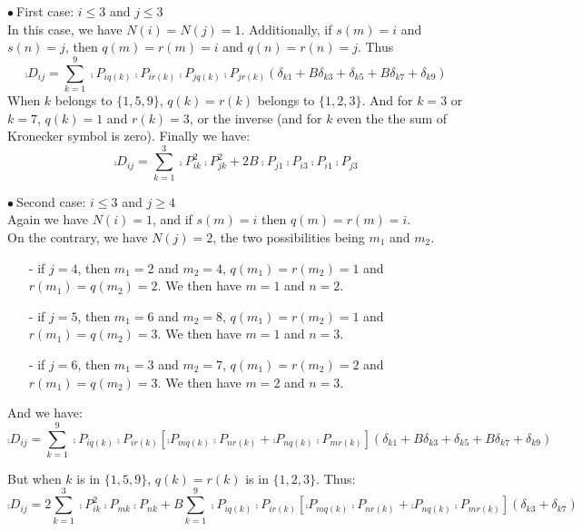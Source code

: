 \vspace{1cm}
$\bullet\ ${\sc First case}: $i\leqslant 3$ and $j\leqslant 3$\\
In this case, we have $N(i)=N(j)=1$. Additionally, if $s(m)=i$ and $s(n)=j$,
then $q(m)=r(m)=i$ and $q(n)=r(n)=j$. Thus \\
\begin{equation}
\comp{D}_{ij}=\sum_{k=1}^9
\comp{P}_{iq(k)}\comp{P}_{ir(k)}\comp{P}_{jq(k)}\comp{P}_{jr(k)}
(\delta_{k1}+ B\delta_{k3}+\delta_{k5}+ B\delta_{k7}+\delta_{k9})
\end{equation}
When $k$ belongs to $\{1,5,9\}$, $q(k)=r(k)$ belongs to $\{1,2,3\}$. And for $k=3$ or
$k=7$, $q(k)=1$ and $r(k)=3$, or the inverse (and for $k$ even the
the sum of Kronecker symbol is zero). Finally we have:
\begin{equation}
\comp{D}_{ij}=\sum_{k=1}^3\comp{P}_{ik}^2\comp{P}_{jk}^2
+2 B\comp{P}_{j1}\comp{P}_{i3}\comp{P}_{i1}\comp{P}_{j3}
\end{equation}

\vspace{1cm}
$\bullet\ ${\sc Second case}: $i\leqslant 3$ and $j\geqslant 4$\\
Again we have $N(i)=1$, and if $s(m)=i$ then $q(m)=r(m)=i$.\\
On the contrary, we have $N(j)=2$, the two possibilities being $m_1$ and $m_2$.\\
\begin{itemize}
\item[-] if $j=4$, then $m_1=2$ and $m_2=4$,
$q(m_1)=r(m_2)=1$ and $r(m_1)=q(m_2)=2$. We then have
$m=1$ and $n=2$.

\item[-] if $j=5$, then $m_1=6$ and $m_2=8$,
$q(m_1)=r(m_2)=1$ and $r(m_1)=q(m_2)=3$. We then have
$m=1$ and $n=3$.

\item[-] if $j=6$, then $m_1=3$ and $m_2=7$,
$q(m_1)=r(m_2)=2$ and $r(m_1)=q(m_2)=3$. We then have
$m=2$ and $n=3$.
\end{itemize}

And we have:
\begin{equation}
\comp{D}_{ij}=\sum_{k=1}^9
\comp{P}_{iq(k)}\comp{P}_{ir(k)}\left[
\comp{P}_{mq(k)}\comp{P}_{nr(k)}+\comp{P}_{nq(k)}\comp{P}_{mr(k)}\right]
(\delta_{k1}+B \delta_{k3}+\delta_{k5}+B \delta_{k7}+\delta_{k9})
\end{equation}

But when $k$ is in $\{1,5,9\}$, $q(k)=r(k)$ is in $\{1,2,3\}$. Thus:
\begin{equation}
\comp{D}_{ij}=2\sum_{k=1}^3
\comp{P}_{ik}^2\comp{P}_{mk}\comp{P}_{nk}
+B \sum_{k=1}^9
\comp{P}_{iq(k)}\comp{P}_{ir(k)}\left[
\comp{P}_{mq(k)}\comp{P}_{nr(k)}+\comp{P}_{nq(k)}\comp{P}_{mr(k)}\right]
(\delta_{k3}+\delta_{k7})
\end{equation}

